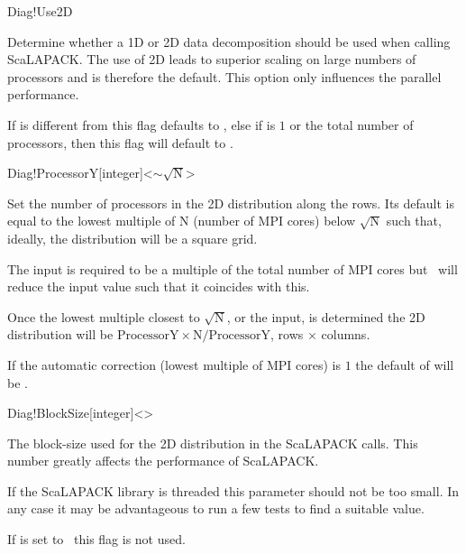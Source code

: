 \begin{fdflogicalT}{Diag!Use2D}

  Determine whether a 1D or 2D data decomposition should be used when
  calling ScaLAPACK. The use of 2D leads to superior scaling on large
  numbers of processors and is therefore the default. This option only
  influences the parallel performance.

  If  is different from  this flag
  defaults to \fdftrue, else if  is $1$ or the
  total number of processors, then this flag will default to
  \fdffalse.

\end{fdflogicalT}

\begin{fdfentry}{Diag!ProcessorY}[integer]<$\sim \sqrt{\mathrm N}$>

  Set the number of processors in the 2D distribution along the rows.
  Its default is equal to the lowest multiple of $\mathrm N$ (number
  of MPI cores) below $\sqrt{\mathrm N}$ such that, ideally, the
  distribution will be a square grid.

  The input is required to be a multiple of the total number of MPI
  cores but \siesta\ will reduce the input value such that it
  coincides with this.

  Once the lowest multiple closest to $\sqrt{\mathrm N}$, or the input, is
  determined the 2D distribution will be $\mathrm{ProcessorY}
  \times\mathrm{N}/\mathrm{ProcessorY}$, rows $\times$ columns.

  \note If the automatic correction (lowest multiple of MPI cores) is
  $1$ the default of  will be \fdffalse.

\end{fdfentry}

\begin{fdfentry}{Diag!BlockSize}[integer]<>
  
  The block-size used for the 2D distribution in the ScaLAPACK calls.
  This number greatly affects the performance of ScaLAPACK.

  If the ScaLAPACK library is threaded this parameter should not be
  too small. In any case it may be advantageous to run a few tests to
  find a suitable value.

  \note If  is set to \fdffalse\ this flag is not
  used. 

\end{fdfentry}


